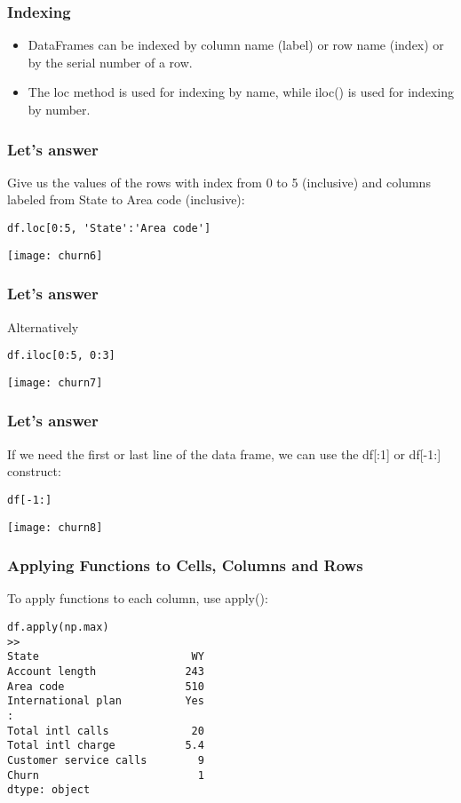 \begin{frame}[fragile]\frametitle{Indexing}	
\begin{itemize}
\item DataFrames can be indexed by column name (label) or row name (index) or by the serial number of a row. 
\item The loc method is used for indexing by name, while iloc() is used for indexing by number.
\end{itemize}

\end{frame}

\begin{frame}[fragile]\frametitle{Let's answer}	
Give us the values of the rows with index from 0 to 5 (inclusive) and columns labeled from State to Area code (inclusive):
\begin{lstlisting}
df.loc[0:5, 'State':'Area code']
\end{lstlisting}
\begin{center}
\texttt{[image: churn6]}
\end{center}
\end{frame}

\begin{frame}[fragile]\frametitle{Let's answer}	
Alternatively
\begin{lstlisting}
df.iloc[0:5, 0:3]
\end{lstlisting}
\begin{center}
\texttt{[image: churn7]}
\end{center}
\end{frame}

\begin{frame}[fragile]\frametitle{Let's answer}	
If we need the first or last line of the data frame, we can use the df[:1] or df[-1:] construct:
\begin{lstlisting}
df[-1:]
\end{lstlisting}
\begin{center}
\texttt{[image: churn8]}
\end{center}
\end{frame}

\begin{frame}[fragile]\frametitle{Applying Functions to Cells, Columns and Rows}	
To apply functions to each column, use apply():
\begin{lstlisting}
df.apply(np.max)
>> 
State                        WY
Account length              243
Area code                   510
International plan          Yes
:
Total intl calls             20
Total intl charge           5.4
Customer service calls        9
Churn                         1
dtype: object
\end{lstlisting}
\end{frame}

